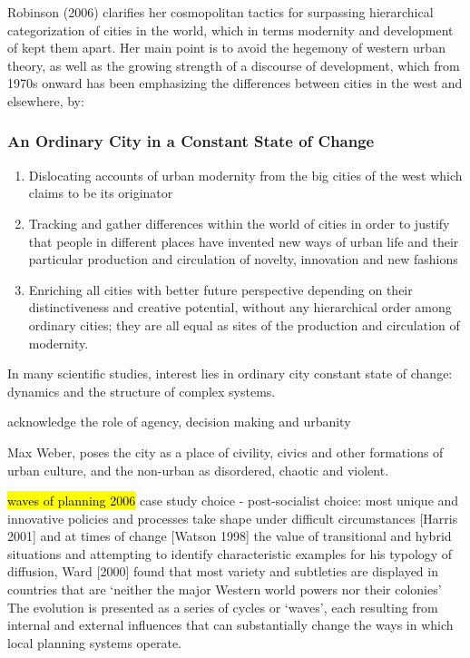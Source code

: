\documentclass[11pt]{report}
\begin{document}
Robinson (2006) clarifies   her  cosmopolitan  tactics  for  surpassing  hierarchical categorization of cities in the world, which in terms modernity and development of kept them apart. Her main point is to avoid the hegemony of western urban theory, as  well as the growing  strength of a discourse of development, which from 1970s onward has been emphasizing the differences between cities in the west and elsewhere, by: 

\subsubsection{An Ordinary City in a Constant State of Change}

\begin{enumerate}
\item Dislocating accounts of urban modernity from the big cities of the west which claims to be its 
originator
\item Tracking  and  gather  differences  within  the  world  of  cities  in  order  to  justify  that  people  in different  places  have  invented  new  ways  of  urban  life  and  their  particular  production  and circulation of novelty, innovation and new fashions
\item Enriching  all  cities  with  better  future  perspective  depending  on  their  distinctiveness  and creative potential, without any hierarchical order among ordinary cities; they are all equal as 
sites of the production and circulation of modernity.
\end{enumerate}
In many scientific studies, interest lies in ordinary city constant state of change: dynamics and the structure of complex systems.

acknowledge the role of agency, decision making and urbanity

Max Weber, poses the city as a place of civility, civics and other formations of urban culture, and  the  non-urban  as  disordered,  chaotic  and violent.

\hl{waves of planning 2006}
case study choice - post-socialist choice:   most  unique  and  innovative  policies  and  processes  take shape under difficult circumstances [Harris 2001] and at times of change [Watson 1998]
the value of transitional and hybrid situations and attempting to identify characteristic  examples  for  his  typology  of  diffusion,  Ward  [2000]  found  that  most  variety  and subtleties are displayed in countries that are ‘neither the major Western world powers nor their colonies’
The evolution is presented as a series of cycles or ‘waves’, each resulting from internal and external influences that can substantially change the ways in which local planning systems operate.
\end{document}
